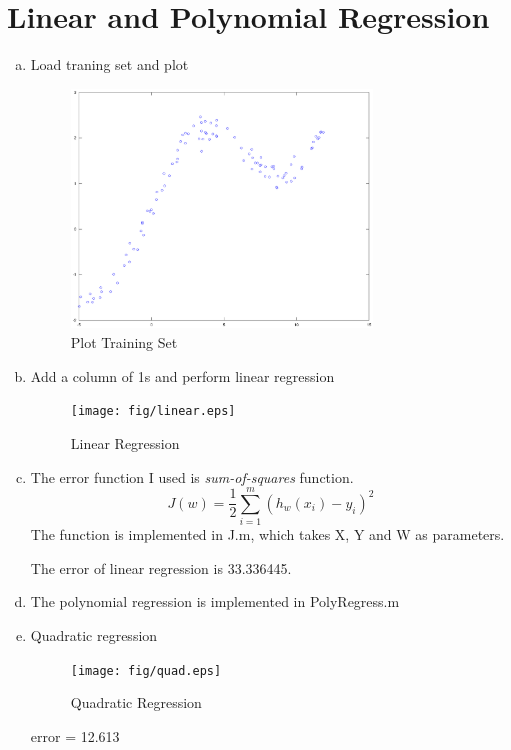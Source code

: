 \documentclass[a4paper, 12pt, titlepage]{article}
\begin{document}
\section{Linear and Polynomial Regression}
\begin{enumerate}[(a)]
        \item Load traning set and plot 
            \begin{figure}[H]
                \centering
                \includegraphics[width=8cm]{fig/a.eps}
                \caption{Plot Training Set}\label{a}
            \end{figure}
        
        \item Add a column of 1s and perform linear regression
            \begin{figure}[H]
                \centering
                \texttt{[image: fig/linear.eps]}
                \caption{Linear Regression}\label{b}
            \end{figure}

        \item The error function I used is \emph{sum-of-squares} function.
            $$J(w)=\frac{1}{2}\sum^m_{i=1}(h_w(x_i)-y_i)^2$$
            The function is implemented in J.m, which takes X, Y and W as parameters.

            The error of linear regression is 33.336445.
        \item The polynomial regression is implemented in PolyRegress.m
        \item Quadratic regression
            \begin{figure}[H]
                \centering
                \texttt{[image: fig/quad.eps]}
                \caption{Quadratic Regression}\label{e}
            \end{figure}

            error = 12.613


\end{enumerate}
\end{document}
